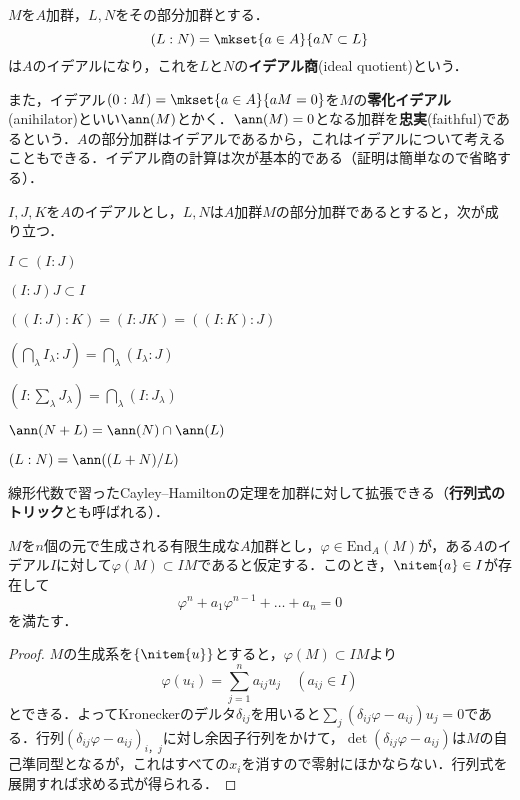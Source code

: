 \begin{defi}[イデアル商]\label{defi:イデアル商}
	$M$を$A$加群，$L,N$をその部分加群とする．
	\[(L:N)=\mkset{a\in A}{aN\subset L}\]
	は$A$のイデアルになり，これを$L$と$N$の\textbf{イデアル商}(ideal quotient)という．
\end{defi}

また，イデアル$(0:M)=\mkset{a\in A}{aM=0}$を$M$の\textbf{零化イデアル}(anihilator)といい$\ann(M)$とかく．$\ann(M)=0$となる加群を\textbf{忠実}(faithful)であるという．$A$の部分加群はイデアルであるから，これはイデアルについて考えることもできる．イデアル商の計算は次が基本的である（証明は簡単なので省略する）．

\begin{prop}\label{prop:加群商}
	$I,J,K$を$A$のイデアルとし，$L,N$は$A$加群$M$の部分加群であるとすると，次が成り立つ．
	\begin{sakura}
		\item $I\subset(I:J)$
		\item $(I:J)J\subset I$
		\item $((I:J):K)=(I:JK)=((I:K):J)$
		\item $(\bigcap_\lambda I_\lambda:J)=\bigcap_\lambda (I_\lambda:J)$
		\item $(I:\sum_\lambda J_\lambda)=\bigcap_\lambda (I:J_\lambda)$
		\item $\ann (N+L)=\ann (N)\cap\ann (L)$
		\item $(L:N)=\ann((L+N)/L)$
	\end{sakura}
\end{prop}

線形代数で習ったCayley--Hamiltonの定理を加群に対して拡張できる（\textbf{行列式のトリック}とも呼ばれる）．
\begin{thm}
	\label{thm:Cayley-Hamilton}
	$M$を$n$個の元で生成される有限生成な$A$加群とし，$\varphi\in\text{End}_A(M)$が，ある$A$のイデアル$I$に対して$\varphi(M)\subset IM$であると仮定する．このとき，$\nitem{a}\in I$が存在して
	\[\varphi^n+a_1\varphi^{n-1}+\dots+a_n=0\]
	を満たす．
\end{thm}
\begin{proof}
	$M$の生成系を$\{\nitem{u}\}$とすると，$\varphi(M)\subset IM$より
	\[\varphi(u_i)=\sum_{j=1}^n a_{ij}u_j\quad(a_{ij}\in I)\]
	とできる．よってKroneckerのデルタ$\delta_{ij}$を用いると$\sum_j(\delta_{ij}\varphi-a_{ij})u_j=0$である．行列$(\delta_{ij}\varphi-a_{ij})_{i，j}$に対し余因子行列をかけて，$\det(\delta_{ij}\varphi-a_{ij})$は$M$の自己準同型となるが，これはすべての$x_i$を消すので零射にほかならない．行列式を展開すれば求める式が得られる．
\end{proof}

